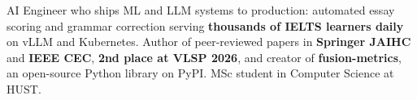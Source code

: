 
\vspace{4pt}

\begin{cvparagraph}
AI Engineer who ships ML and LLM systems to production: automated essay scoring and grammar correction serving \textbf{thousands of IELTS learners daily} on vLLM and Kubernetes. Author of peer-reviewed papers in \textbf{Springer JAIHC} and \textbf{IEEE CEC}, \textbf{2nd place at VLSP 2026}, and creator of \textbf{fusion-metrics}, an open-source Python library on PyPI. MSc student in Computer Science at HUST.
\end{cvparagraph}

\vspace{4pt}
